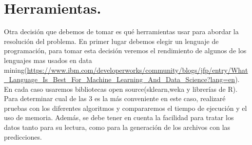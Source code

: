  \section{Herramientas.}
 Otra decisión que debemos de tomar es qué herramientas usar para abordar la resolución del problema. En primer lugar debemos elegir un lenguaje de programación, para tomar esta decisión veremos el rendimiento de algunos de los lenguajes mas usados en data mining(\url{https://www.ibm.com/developerworks/community/blogs/jfp/entry/What_Language_Is_Best_For_Machine_Learning_And_Data_Science?lang=en}). En cada caso usaremos bibliotecas open source(sklearn,weka y librerías de R). Para determinar cual de las 3 es la más conveniente en este caso, realizaré pruebas con los diferentes algoritmos y compararemos el tiempo de ejecución y el uso de memoria. Además, se debe tener en cuenta la facilidad para tratar los datos tanto para su lectura, como para la generación de los archivos con las predicciones. 
 
